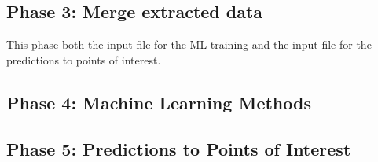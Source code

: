 \documentclass[letterpaper,12pt]{article}
\begin{document}

\pagebreak
\subsection{Phase 3: Merge extracted data}

This phase both the input file for the ML training and the input file for the predictions to points of interest.



\pagebreak
\subsection{Phase 4: Machine Learning Methods} 



\pagebreak
\subsection{Phase 5: Predictions to Points of Interest} 







%


%

\end{document}

